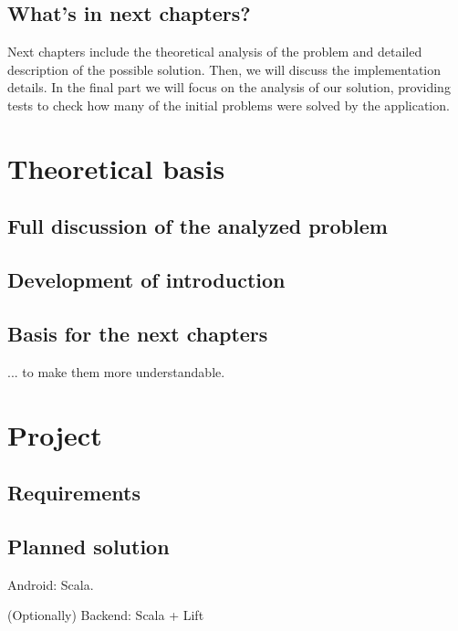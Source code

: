 \documentclass[american]{bsc}
\begin{document}
\section{What's in next chapters?}
\label{sec:nextchapters}

Next chapters include the theoretical analysis of the problem and detailed description of the possible solution. Then, we will discuss the implementation details. In the final part we will focus on the analysis of our solution, providing tests to check how many of the initial problems were solved by the application.

\chapter{Theoretical basis}
\label{chap:theory}

\section{Full discussion of the analyzed problem}
\label{sec:fulldisc}

\section{Development of introduction}
\label{sec:introdevelopment}

\section{Basis for the next chapters}
\label{sec:nextchapterbasis}

... to make them more understandable.

\chapter{Project}
\label{chap:project}

\section{Requirements}
\label{sec:requirements}

\section{Planned solution}
\label{sec:plan}

Android: Scala.

(Optionally) Backend: Scala + Lift
\end{document}
